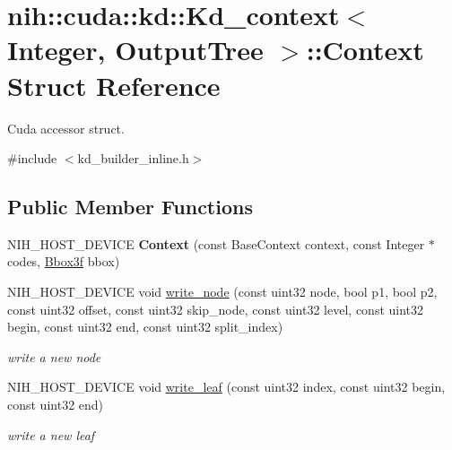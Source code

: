 \hypertarget{structnih_1_1cuda_1_1kd_1_1_kd__context_1_1_context}{
\section{nih\-:\-:cuda\-:\-:kd\-:\-:\-Kd\-\_\-context$<$ \-Integer, \-Output\-Tree $>$\-:\-:\-Context \-Struct \-Reference}
\label{structnih_1_1cuda_1_1kd_1_1_kd__context_1_1_context}
}


\-Cuda accessor struct.  




{\ttfamily \#include $<$kd\-\_\-builder\-\_\-inline.\-h$>$}

\subsection*{\-Public \-Member \-Functions}
\begin{DoxyCompactItemize}
\item 
\hypertarget{structnih_1_1cuda_1_1kd_1_1_kd__context_1_1_context_ade631a9ca4114322d723a9365da6857d}{
\-N\-I\-H\-\_\-\-H\-O\-S\-T\-\_\-\-D\-E\-V\-I\-C\-E {\bfseries \-Context} (const \-Base\-Context context, const \-Integer $\ast$codes, \hyperlink{structnih_1_1_bbox}{\-Bbox3f} bbox)}
\label{structnih_1_1cuda_1_1kd_1_1_kd__context_1_1_context_ade631a9ca4114322d723a9365da6857d}

\item 
\hypertarget{structnih_1_1cuda_1_1kd_1_1_kd__context_1_1_context_a5666cc908c4d0cbdaea73df0267e2b7b}{
\-N\-I\-H\-\_\-\-H\-O\-S\-T\-\_\-\-D\-E\-V\-I\-C\-E void \hyperlink{structnih_1_1cuda_1_1kd_1_1_kd__context_1_1_context_a5666cc908c4d0cbdaea73df0267e2b7b}{write\-\_\-node} (const uint32 node, bool p1, bool p2, const uint32 offset, const uint32 skip\-\_\-node, const uint32 level, const uint32 begin, const uint32 end, const uint32 split\-\_\-index)}
\label{structnih_1_1cuda_1_1kd_1_1_kd__context_1_1_context_a5666cc908c4d0cbdaea73df0267e2b7b}

\begin{DoxyCompactList}\small\item\em write a new node \end{DoxyCompactList}\item 
\hypertarget{structnih_1_1cuda_1_1kd_1_1_kd__context_1_1_context_ad15b1e0707113f2f30249c13d492fad8}{
\-N\-I\-H\-\_\-\-H\-O\-S\-T\-\_\-\-D\-E\-V\-I\-C\-E void \hyperlink{structnih_1_1cuda_1_1kd_1_1_kd__context_1_1_context_ad15b1e0707113f2f30249c13d492fad8}{write\-\_\-leaf} (const uint32 index, const uint32 begin, const uint32 end)}
\label{structnih_1_1cuda_1_1kd_1_1_kd__context_1_1_context_ad15b1e0707113f2f30249c13d492fad8}

\begin{DoxyCompactList}\small\item\em write a new leaf \end{DoxyCompactList}\end{DoxyCompactItemize}
